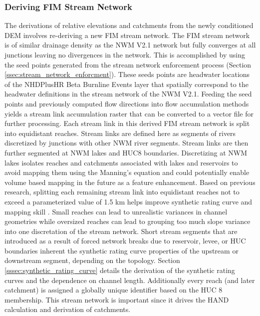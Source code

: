 \documentclass[draft]{dependencies/agujournal2019}
\begin{document}
\subsubsection{Deriving FIM Stream Network}
\label{sssec:deriving_fim_stream_network}
%
The derivations of relative elevations and catchments from the newly conditioned DEM involves re-deriving a new FIM stream network. 
The FIM stream network is of similar drainage density as the NWM V2.1 network but fully converges at all junctions leaving no divergences in the network.
This is accomplished by using the seed points generated from the stream network enforcement process (Section \ref{ssec:stream_network_enforcment}).
These seeds points are headwater locations of the NHDPlusHR Beta Burnline Events layer that spatially correspond to the headwater definitions in the stream network of the NWM V2.1.
Feeding the seed points and previously computed flow directions into flow accumulation methods \cite{wallis2009parallel,tarboton1997new,tarboton2005terrain} yields a stream link accumulation raster that can be converted to a vector file for further processing.
Each stream link in this derived FIM stream network is split into equidistant reaches.
Stream links are defined here as segments of rivers discretized by junctions with other NWM river segments.
Stream links are then further segmented at NWM lakes and HUC8 boundaries.
Discretizing at NWM lakes isolates reaches and catchments associated with lakes and reservoirs to avoid mapping them using the Manning's equation and could potentially enable volume based mapping in the future as a feature enhancement.
Based on previous research, splitting each remaining stream link into equidistant reaches not to exceed a parameterized value of 1.5 km helps improve synthetic rating curve and mapping skill \cite{garousi2019terrain,godbout2019error,zheng2018geoflood}.
Small reaches can lead to unrealistic variances in channel geometries while oversized reaches can lead to grouping too much slope variance into one discretation of the stream network.
Short stream segments that are introduced as a result of forced network breaks due to reservoir, levee, or HUC boundaries inherent the synthetic rating curve properties of the upstream or downstream segment, depending on the topology.
Section \ref{sssec:synthetic_rating_curve} details the derivation of the synthetic rating curves and the dependence on channel length. 
Additionally every reach (and later catchment) is assigned a globally unique identifier based on the HUC 8 membership.
This stream network is important since it drives the HAND calculation and derivation of catchments.
%
\end{document}
